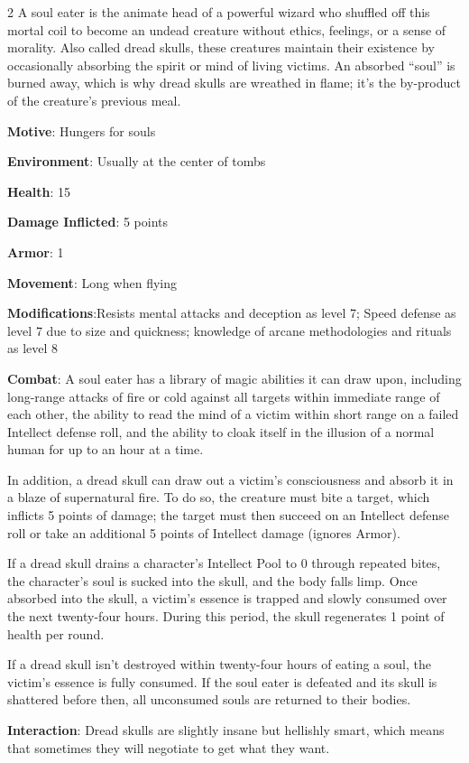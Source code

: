 \begin{multicols}{2}
A soul eater is the animate head of a powerful wizard who shuffled off this mortal coil to become an undead creature without ethics, feelings, or a sense of morality. Also called dread skulls, these creatures maintain their existence by occasionally absorbing the spirit or mind of living victims. An absorbed “soul” is burned away, which is why dread skulls are wreathed in flame; it’s the by-product of the creature’s previous meal. 

\textbf{Motive}: Hungers for souls 

\textbf{Environment}: Usually at the center of tombs 

\textbf{Health}: 15 

\textbf{Damage Inflicted}: 5 points 

\textbf{Armor}: 1 

\textbf{Movement}: Long when flying 

\textbf{Modifications}:Resists mental attacks and deception as level 7; Speed defense as level 7 due to size and quickness; knowledge of arcane methodologies and rituals as level 8 

\textbf{Combat}: A soul eater has a library of magic abilities it can draw upon, including long-range attacks of fire or cold against all targets within immediate range of each other, the ability to read the mind of a victim within short range on a failed Intellect defense roll, and the ability to cloak itself in the illusion of a normal human for up to an hour at a time. 

In addition, a dread skull can draw out a victim’s consciousness and absorb it in a blaze of supernatural fire. To do so, the creature must bite a target, which inflicts 5 points of damage; the target must then succeed on an Intellect defense roll or take an additional 5 points of Intellect damage (ignores Armor). 

If a dread skull drains a character’s Intellect Pool to 0 through repeated bites, the character’s soul is sucked into the skull, and the body falls limp. Once absorbed into the skull, a victim’s essence is trapped and slowly consumed over the next twenty-four hours. During this period, the skull regenerates 1 point of health per round. 

If a dread skull isn’t destroyed within twenty-four hours of eating a soul, the victim’s essence is fully consumed. If the soul eater is defeated and its skull is shattered before then, all unconsumed souls are returned to their bodies. 

\textbf{Interaction}: Dread skulls are slightly insane but hellishly smart, which means that sometimes they will negotiate to get what they want. 


\end{multicols}
